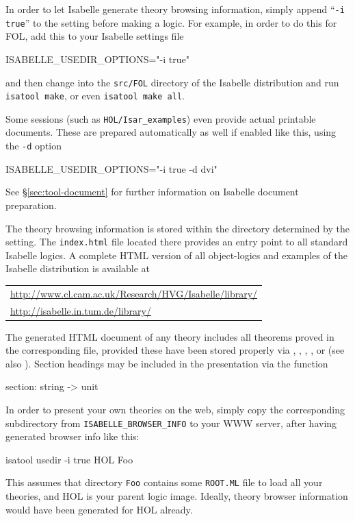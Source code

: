 \medskip

In order to let Isabelle generate theory browsing information, simply append
``\texttt{-i true}'' to the  setting before
making a logic.  For example, in order to do this for FOL, add this to your
Isabelle settings file
\begin{ttbox}
ISABELLE_USEDIR_OPTIONS="-i true"
\end{ttbox}
and then change into the \texttt{src/FOL} directory of the Isabelle
distribution and run \texttt{isatool make}, or even \texttt{isatool make all}.

Some sessions (such as \texttt{HOL/Isar_examples}) even provide actual
printable documents.  These are prepared automatically as well if enabled like
this, using the \texttt{-d} option
\begin{ttbox}
ISABELLE_USEDIR_OPTIONS="-i true -d dvi"
\end{ttbox}
See \S\ref{sec:tool-document} for further information on Isabelle document
preparation.

\bigskip The theory browsing information is stored within the directory
determined by the  setting.  The
\texttt{index.html} file located there provides an entry point to all standard
Isabelle logics.  A complete HTML version of all object-logics and examples of
the Isabelle distribution is available at
\begin{center}\small
  \begin{tabular}{l}
    \url{http://www.cl.cam.ac.uk/Research/HVG/Isabelle/library/} \\
    \url{http://isabelle.in.tum.de/library/} \\
  \end{tabular}
\end{center}

\medskip

The generated HTML document of any theory includes all theorems proved in the
corresponding {\ML} file, provided these have been stored properly via
, , , ,
 or  (see also \cite{isabelle-ref}).
Section headings may be included in the presentation via the {\ML} function
\begin{ttbox}
section: string -> unit
\end{ttbox}

\medskip

In order to present your own theories on the web, simply copy the
corresponding subdirectory from \texttt{ISABELLE_BROWSER_INFO} to your WWW
server, after having generated browser info like this:
\begin{ttbox}
isatool usedir -i true HOL Foo
\end{ttbox}
This assumes that directory \texttt{Foo} contains some \texttt{ROOT.ML} file
to load all your theories, and HOL is your parent logic image.  Ideally,
theory browser information would have been generated for HOL already.

